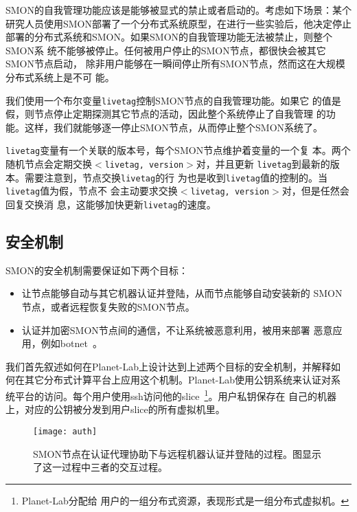 SMON的自我管理功能应该是能够被显式的禁止或者启动的。考虑如下场景：某个
研究人员使用SMON部署了一个分布式系统原型，在进行一些实验后，他决定停止
部署的分布式系统和SMON。如果SMON的自我管理功能无法被禁止，则整个SMON系
统不能够被停止。任何被用户停止的SMON节点，都很快会被其它SMON节点启动，
除非用户能够在一瞬间停止所有SMON节点，然而这在大规模分布式系统上是不可
能。

我们使用一个布尔变量\texttt{livetag}控制SMON节点的自我管理功能。如果它
的值是假，则节点停止定期探测其它节点的活动，因此整个系统停止了自我管理
的功能。这样，我们就能够逐一停止SMON节点，从而停止整个SMON系统了。

\texttt{livetag}变量有一个关联的版本号，每个SMON节点维护着变量的一个复
本。两个随机节点会定期交换\texttt{$<$livetag, version$>$}对，并且更新
\texttt{livetag}到最新的版本。需要注意到，节点交换\texttt{livetag}的行
为也是收到\texttt{livetag}值的控制的。当\texttt{livetag}值为假，节点不
会主动要求交换\texttt{$<$livetag, version$>$}对，但是任然会回复交换消
息，这能够加快更新\texttt{livetag}的速度。

\subsection{安全机制}
\label{subsec:security}

SMON的安全机制需要保证如下两个目标：

\begin{itemize}

  \item 让节点能够自动与其它机器认证并登陆，从而节点能够自动安装新的
  SMON节点，或者远程恢复失败的SMON节点。

  \item 认证并加密SMON节点间的通信，不让系统被恶意利用，被用来部署
  恶意应用，例如botnet~\cite{botnet}。

\end{itemize}

我们首先叙述如何在Planet-Lab上设计达到上述两个目标的安全机制，并解释如
何在其它分布式计算平台上应用这个机制。Planet-Lab使用公钥系统来认证对系
统平台的访问。每个用户使用ssh访问他的slice~\footnote{Planet-Lab分配给
用户的一组分布式资源，表现形式是一组分布式虚拟机。}。用户私钥保存在
自己的机器上，对应的公钥被分发到用户slice的所有虚拟机里。

\begin{figure}
\centering
  \begin{minipage}{0.8\linewidth}
    \centering
    \texttt{[image: auth]}
    \caption{SMON节点在认证代理协助下与远程机器认证并登陆的过程。图显示
    了这一过程中三者的交互过程。}
    \label{fig:auth}
  \end{minipage}
\end{figure}

